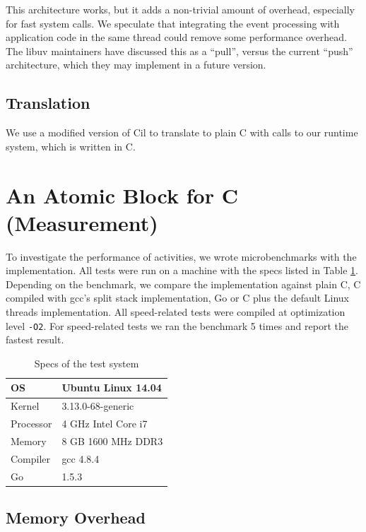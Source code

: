 \documentclass[sigplan,10pt,review,anonymous]{acmart}\settopmatter{printfolios=true,printccs=false,printacmref=false}
\begin{document}
This architecture works, but it adds a non-trivial amount of overhead, especially for fast system calls.
We speculate that integrating the event processing with application code in the same thread could remove some performance overhead.
The libuv maintainers have discussed this as a ``pull'', versus the current ``push'' architecture, which they may implement in a future version.

\subsection{Translation}

We use a modified version of Cil \cite{Necula2002} to translate \charcoal{} to plain C with calls to our runtime system, which is written in C.

\section{An Atomic Block for C (Measurement)}

To investigate the performance of activities, we wrote microbenchmarks with the \charcoal{} implementation.
All tests were run on a machine with the specs listed in Table \ref{table:specs}.
Depending on the benchmark, we compare the \charcoal{} implementation against plain C, C compiled with gcc's split stack implementation, Go or C plus the default Linux threads implementation.
All speed-related tests were compiled at optimization level \texttt{-O2}.
For speed-related tests we ran the benchmark 5 times and report the fastest result.

\begin{table}
  \centering
  \begin{tabular}{|l|l|}
    \hline
    OS & Ubuntu Linux 14.04 \\
    \hline
    Kernel & 3.13.0-68-generic \\
    \hline
    Processor & 4 GHz Intel Core i7 \\
    \hline
    Memory & 8 GB 1600 MHz DDR3 \\
    \hline
    Compiler & gcc 4.8.4 \\
    \hline
    Go & 1.5.3 \\
    \hline
  \end{tabular}
  \caption{Specs of the test system}
  \label{table:specs}
\end{table}

\subsection{Memory Overhead}
\end{document}
